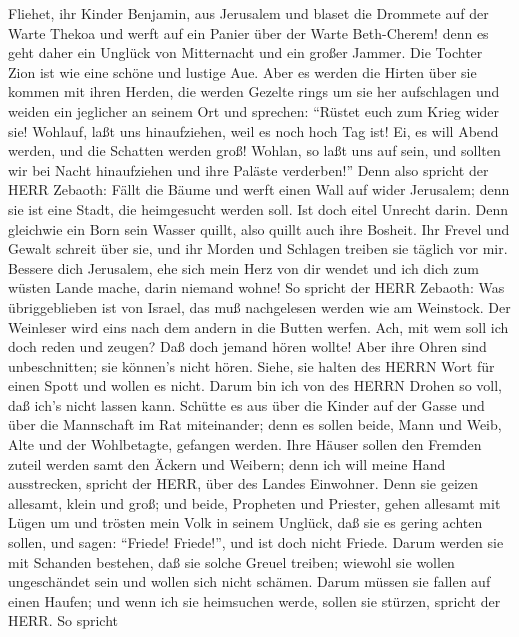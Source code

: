  Fliehet, ihr Kinder Benjamin, aus Jerusalem und blaset die
Drommete auf der Warte Thekoa und werft auf ein Panier über der Warte
Beth-Cherem! denn es geht daher ein Unglück von Mitternacht und ein
großer Jammer.  Die Tochter Zion ist wie eine schöne und
lustige Aue.  Aber es werden die Hirten über sie kommen mit
ihren Herden, die werden Gezelte rings um sie her aufschlagen und weiden
ein jeglicher an seinem Ort und sprechen:  ``Rüstet euch zum
Krieg wider sie! Wohlauf, laßt uns hinaufziehen, weil es noch hoch Tag
ist! Ei, es will Abend werden, und die Schatten werden groß!
 Wohlan, so laßt uns auf sein, und sollten wir bei Nacht
hinaufziehen und ihre Paläste verderben!''  Denn also
spricht der HERR Zebaoth: Fällt die Bäume und werft einen Wall auf wider
Jerusalem; denn sie ist eine Stadt, die heimgesucht werden soll. Ist
doch eitel Unrecht darin.  Denn gleichwie ein Born sein
Wasser quillt, also quillt auch ihre Bosheit. Ihr Frevel und Gewalt
schreit über sie, und ihr Morden und Schlagen treiben sie täglich vor
mir.  Bessere dich Jerusalem, ehe sich mein Herz von dir
wendet und ich dich zum wüsten Lande mache, darin niemand wohne!
 So spricht der HERR Zebaoth: Was übriggeblieben ist von
Israel, das muß nachgelesen werden wie am Weinstock. Der Weinleser wird
eins nach dem andern in die Butten werfen.  Ach, mit wem
soll ich doch reden und zeugen? Daß doch jemand hören wollte! Aber ihre
Ohren sind unbeschnitten; sie können's nicht hören. Siehe, sie halten
des HERRN Wort für einen Spott und wollen es nicht.  Darum
bin ich von des HERRN Drohen so voll, daß ich's nicht lassen kann.
Schütte es aus über die Kinder auf der Gasse und über die Mannschaft im
Rat miteinander; denn es sollen beide, Mann und Weib, Alte und der
Wohlbetagte, gefangen werden.  Ihre Häuser sollen den
Fremden zuteil werden samt den Äckern und Weibern; denn ich will meine
Hand ausstrecken, spricht der HERR, über des Landes Einwohner.
 Denn sie geizen allesamt, klein und groß; und beide,
Propheten und Priester, gehen allesamt mit Lügen um  und
trösten mein Volk in seinem Unglück, daß sie es gering achten sollen,
und sagen: ``Friede! Friede!'', und ist doch nicht Friede. 
Darum werden sie mit Schanden bestehen, daß sie solche Greuel treiben;
wiewohl sie wollen ungeschändet sein und wollen sich nicht schämen.
Darum müssen sie fallen auf einen Haufen; und wenn ich sie heimsuchen
werde, sollen sie stürzen, spricht der HERR.  So spricht
